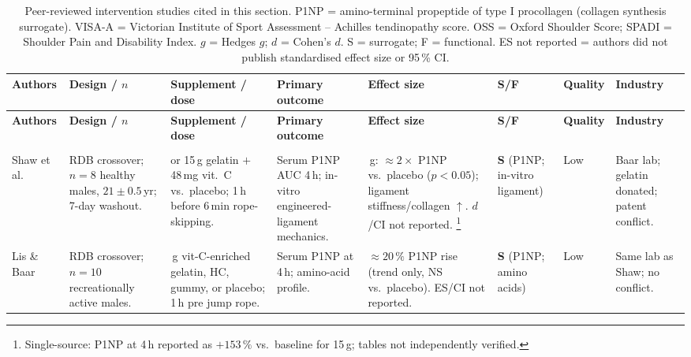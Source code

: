 {\footnotesize
\setlength{\tabcolsep}{4pt}
\renewcommand{\arraystretch}{1.2}
\begin{longtable}{>{\raggedright\arraybackslash}p{2.0cm}
                  >{\raggedright\arraybackslash}p{2.0cm}
                  >{\raggedright\arraybackslash}p{2.0cm}
                  >{\raggedright\arraybackslash}p{2.2cm}
                  >{\raggedright\arraybackslash}p{2.5cm}
                  >{\raggedright\arraybackslash}p{1.2cm}
                  >{\raggedright\arraybackslash}p{1.2cm}
                  >{\raggedright\arraybackslash}p{1.0cm}}
\caption{Peer-reviewed intervention studies cited in this section.
         P1NP = amino-terminal propeptide of type I procollagen (collagen synthesis surrogate).
         VISA-A = Victorian Institute of Sport Assessment -- Achilles tendinopathy score.
         OSS = Oxford Shoulder Score; SPADI = Shoulder Pain and Disability Index.
         $g$ = Hedges $g$; $d$ = Cohen's $d$.
         S = surrogate; F = functional.
         ES not reported = authors did not publish standardised effect size or 95\,\% CI.}\label{tab:suppstudy}\\
\toprule
\textbf{Authors} & \textbf{Design / $n$} & \textbf{Supplement / dose} & \textbf{Primary outcome} & \textbf{Effect size} & \textbf{S/F} & \textbf{Quality} & \textbf{Industry} \\
\midrule
\endfirsthead
\toprule
\textbf{Authors} & \textbf{Design / $n$} & \textbf{Supplement / dose} & \textbf{Primary outcome} & \textbf{Effect size} & \textbf{S/F} & \textbf{Quality} & \textbf{Industry} \\
\midrule
\endhead
\midrule
\multicolumn{8}{r}{\itshape Continued on next page}\\
\endfoot
\bottomrule
\endlastfoot

Shaw et al.\ \cite{SLBR+17}
&
RDB crossover; $n=8$ healthy males, $21{\pm}0.5$\,yr; 7-day washout.
&
5 or 15\,g gelatin $+$ 48\,mg vit.~C vs.\ placebo; 1\,h before 6\,min rope-skipping.
&
Serum P1NP AUC 4\,h; in-vitro engineered-ligament mechanics.
&
15\,g: ${\approx}2{\times}$ P1NP vs.\ placebo ($p{<}0.05$); ligament stiffness/collagen $\uparrow$. $d$/CI not reported.%
\footnote{Single-source: P1NP at 4\,h reported as $+153\,\%$ vs.\ baseline for 15\,g; tables not independently verified.}
&
\textbf{S} (P1NP; in-vitro ligament)
&
Low
&
Baar lab; gelatin donated; patent conflict.\\

\addlinespace

Lis \& Baar \cite{LB19}
&
RDB crossover; $n=10$ recreationally active males.
&
15\,g vit-C-enriched gelatin, HC, gummy, or placebo; 1\,h pre jump rope.
&
Serum P1NP at 4\,h; amino-acid profile.
&
${\approx}20\,\%$ P1NP rise (trend only, NS vs.\ placebo). ES/CI not reported.
&
\textbf{S} (P1NP; amino acids)
&
Low
&
Same lab as Shaw; no conflict.\\


\end{longtable}}
